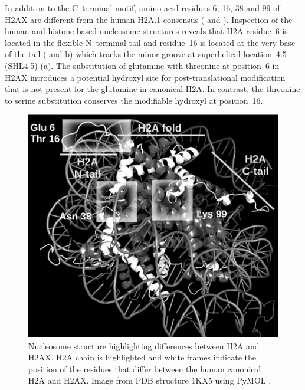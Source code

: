 In addition to the C--terminal motif, amino acid residues 6, 16, 38 and 99 of H2AX are different
from the human H2A.1 consensus ( and ). Inspection
of the human and  histone based nucleosome structures reveals that H2A residue~6 is
located in the flexible N--terminal tail and residue~16 is located at the very base of the tail
( and b) which tracks the minor groove at superhelical
location~4.5 (SHL4.5) (a). The substitution of glutamine with threonine at
position~6 in H2AX introduces a potential hydroxyl site for post-translational modification that is
not present for the glutamine in canonical H2A. In contrast, the threonine to serine substitution
conserves the modifiable hydroxyl at position~16.

\begin{figure}
\includegraphics{Fig4}
\caption{Nucleosome structure highlighting differences between H2A and H2AX\@. H2A chain is
highlighted and white frames indicate the position of the residues that differ between the human
canonical H2A and H2AX\@. Image from PDB structure 1KX5 using PyMOL \protect\citep{DeL02}.}
\label{fig:h2ax-review:H2AInNucleosome}
\end{figure}

